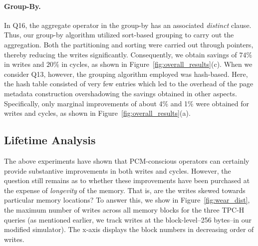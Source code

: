 \paragraph{Group-By.}
In Q16, the aggregate operator in the group-by has an associated
\textit{distinct} clause.  Thus, our group-by algorithm utilized
sort-based grouping to carry out the
aggregation. Both the partitioning and sorting were carried out through
pointers, thereby reducing the writes significantly. Consequently,
we obtain savings of $74\%$ in writes and $20\%$ in cycles, as shown
in Figure~\ref{fig:overall_results}(c).  When we consider Q13, however,
the grouping algorithm employed was hash-based. Here, the hash table consisted
of very few entries which led to the overhead of the page metadata construction
overshadowing the
savings obtained in other aspects. Specifically, only marginal improvements
of about 4\% and 1\% were obtained for writes and cycles, as shown in
Figure~\ref{fig:overall_results}(a).




\subsection{Lifetime Analysis}

The above experiments have shown that PCM-conscious operators
can certainly provide substantive improvements in both writes and
cycles. However, the question still remains as to whether these
improvements have been purchased at the expense of \emph{longevity} of
the memory. That is, are the writes skewed towards particular memory
locations?  To answer this, we show in Figure~\ref{fig:wear_dist}, the
maximum number of writes across all memory blocks for the three TPC-H queries
(as mentioned earlier,
we track writes at the block-level--256 bytes--in our modified simulator). The
x-axis displays the block numbers in 
decreasing order of writes. 

